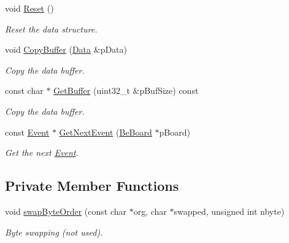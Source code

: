 \begin{CompactItemize}
void \hyperlink{class_ph2___hw_interface_1_1_data_b33619d62d7662d11cf6c2bddebcc835}{Reset} ()
\begin{CompactList}\small\item\em Reset the data structure. \item\end{CompactList}\item 
void \hyperlink{class_ph2___hw_interface_1_1_data_751235bbc2393f58f9fd83b8837ad2b4}{Copy\-Buffer} (\hyperlink{class_ph2___hw_interface_1_1_data}{Data} \&p\-Data)
\begin{CompactList}\small\item\em Copy the data buffer. \item\end{CompactList}\item 
const char $\ast$ \hyperlink{class_ph2___hw_interface_1_1_data_6093f26d20db6ca6a2a248b6bc8ddb25}{Get\-Buffer} (uint32\_\-t \&p\-Buf\-Size) const 
\begin{CompactList}\small\item\em Copy the data buffer. \item\end{CompactList}\item 
const \hyperlink{class_ph2___hw_interface_1_1_event}{Event} $\ast$ \hyperlink{class_ph2___hw_interface_1_1_data_1189154802fd46c30d22014a33426d65}{Get\-Next\-Event} (\hyperlink{class_ph2___hw_description_1_1_be_board}{Be\-Board} $\ast$p\-Board)
\begin{CompactList}\small\item\em Get the next \hyperlink{class_ph2___hw_interface_1_1_event}{Event}. \item\end{CompactList}\end{CompactItemize}
\subsection*{Private Member Functions}
\begin{CompactItemize}
\item 
void \hyperlink{class_ph2___hw_interface_1_1_data_91b7bafc8b47251b022aab16e19fa722}{swap\-Byte\-Order} (const char $\ast$org, char $\ast$swapped, unsigned int nbyte)
\begin{CompactList}\small\item\em Byte swapping (not used). \item\end{CompactList}\end{CompactItemize}
